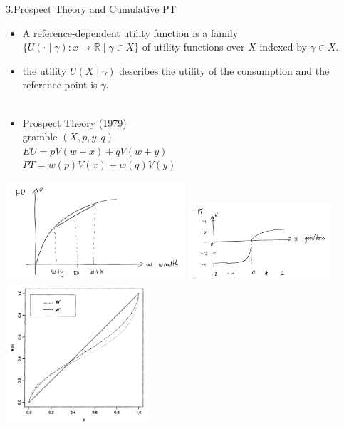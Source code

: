 \documentclass[11pt,aspectratio=169]{beamer}
\begin{document}
\begin{frame}{3.Prospect Theory and Cumulative PT}
    \begin{itemize}
        \item A reference-dependent utility function is a family\\
    $ \{U(\cdot \mid \gamma):x \longrightarrow \mathbb{R} \mid \gamma \in X\} $ 
    of utility functions over $X$ indexed by $\gamma \in X$.\\
        \item the utility $U(X \mid \gamma)$ describes the utility of the consumption and the reference point is $\gamma$.\\
\hspace*{\fill} \\
        \item Prospect Theory (1979)\\
            gramble $ (X,p,y,q)$\\
            $EU=p V(w +x)+qV(w+y)$\\
            $PT=w(p)V(x)+w(q)V(y)$\\
\end{itemize}  
\end{frame}
\begin{frame}
    \includegraphics[width = 0.5\textwidth]{fig1.png}
    \includegraphics[width = 0.4\textwidth]{fig2.png}
	\includegraphics[width = 0.4\textwidth]{fig3.png}
\end{frame}
\end{document}

